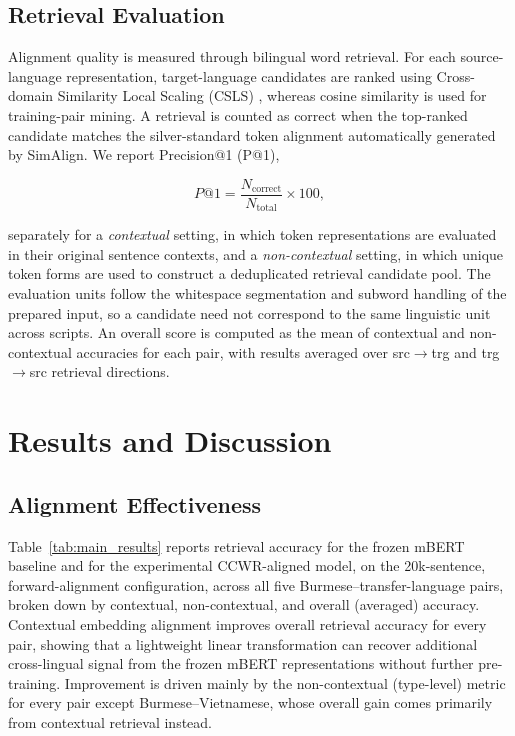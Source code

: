 \documentclass[11pt]{article}
\begin{document}
\subsection{Retrieval Evaluation}
\label{sec:eval_metrics}

Alignment quality is measured through bilingual word retrieval. For each source-language representation, target-language candidates are ranked using Cross-domain Similarity Local Scaling (CSLS) \citep{conneau2018word}, whereas cosine similarity is used for training-pair mining. A retrieval is counted as correct when the top-ranked candidate matches the silver-standard token alignment automatically generated by SimAlign. We report Precision@1 (P@1),

\begin{equation}
P@1 = \frac{N_{\mathrm{correct}}}{N_{\mathrm{total}}} \times 100,
\label{eq:p1}
\end{equation}

separately for a \emph{contextual} setting, in which token representations are evaluated in their original sentence contexts, and a \emph{non-contextual} setting, in which unique token forms are used to construct a deduplicated retrieval candidate pool. The evaluation units follow the whitespace segmentation and subword handling of the prepared input, so a candidate need not correspond to the same linguistic unit across scripts. An overall score is computed as the mean of contextual and non-contextual accuracies for each pair, with results averaged over src$\to$trg and trg$\to$src retrieval directions.

\section{Results and Discussion}
\label{sec:results}

\subsection{Alignment Effectiveness}
\label{sec:overall_performance}

Table~\ref{tab:main_results} reports retrieval accuracy for the frozen mBERT baseline and for the experimental CCWR-aligned model, on the 20k-sentence, forward-alignment configuration, across all five Burmese--transfer-language pairs, broken down by contextual, non-contextual, and overall (averaged) accuracy. Contextual embedding alignment improves overall retrieval accuracy for
every pair, showing that a lightweight linear transformation can recover
additional cross-lingual signal from the frozen mBERT representations
without further pre-training. Improvement is driven mainly by the non-contextual (type-level) metric for every pair except Burmese--Vietnamese, whose overall gain comes primarily from contextual retrieval instead.
\end{document}
